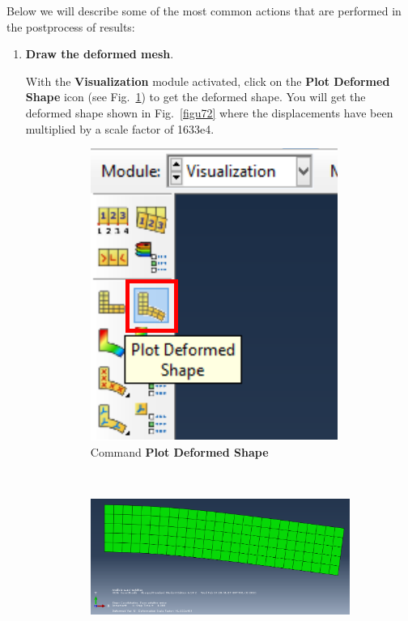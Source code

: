 Below we will describe some of the most common actions that are
performed in the postprocess of results:
\begin{enumerate}
\item \textbf{Draw the deformed mesh}. ~

  With the \textbf{Visualization} module activated, click on the
  \textbf{Plot Deformed Shape} icon (see Fig.~\ref{figu71}) to get the
  deformed shape. You will get the deformed shape shown in
  Fig.~\ref{figu72} where the displacements have been multiplied by
  a scale factor of 1633e4.
  \begin{figure}[H]
    \centering
    \begin{subfigure}{0.25\textwidth}
      \includegraphics[width=\textwidth]{./body/images/imagen71.pdf}
      \caption{Command \textbf{Plot Deformed Shape}}
      \label{figu71}
    \end{subfigure}%
    ~ %
    \begin{subfigure}{0.59\textwidth}
      \includegraphics[width=\textwidth]{./body/images/imagen72}

\end{subfigure}
\end{figure}
\end{enumerate}
